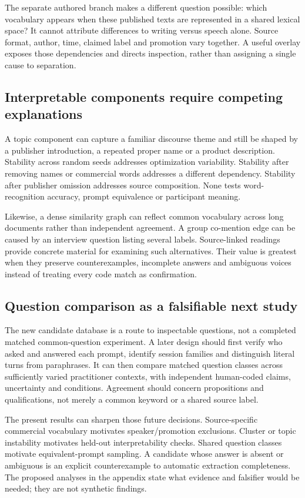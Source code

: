 The separate authored branch makes a different question possible: which vocabulary appears when these published texts are represented in a shared lexical space? It cannot attribute differences to writing versus speech alone. Source format, author, time, claimed label and promotion vary together. A useful overlay exposes those dependencies and directs inspection, rather than assigning a single cause to separation.

\subsection{Interpretable components require competing explanations}
A topic component can capture a familiar discourse theme and still be shaped by a publisher introduction, a repeated proper name or a product description. Stability across random seeds addresses optimization variability. Stability after removing names or commercial words addresses a different dependency. Stability after publisher omission addresses source composition. None tests word-recognition accuracy, prompt equivalence or participant meaning.

Likewise, a dense similarity graph can reflect common vocabulary across long documents rather than independent agreement. A group co-mention edge can be caused by an interview question listing several labels. Source-linked readings provide concrete material for examining such alternatives. Their value is greatest when they preserve counterexamples, incomplete answers and ambiguous voices instead of treating every code match as confirmation.

\subsection{Question comparison as a falsifiable next study}
The new candidate database is a route to inspectable questions, not a completed matched common-question experiment. A later design should first verify who asked and answered each prompt, identify session families and distinguish literal turns from paraphrases. It can then compare matched question classes across sufficiently varied practitioner contexts, with independent human-coded claims, uncertainty and conditions. Agreement should concern propositions and qualifications, not merely a common keyword or a shared source label.

The present results can sharpen those future decisions. Source-specific commercial vocabulary motivates speaker/promotion exclusions. Cluster or topic instability motivates held-out interpretability checks. Shared question classes motivate equivalent-prompt sampling. A candidate whose answer is absent or ambiguous is an explicit counterexample to automatic extraction completeness. The proposed analyses in the appendix state what evidence and falsifier would be needed; they are not synthetic findings.

